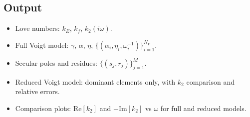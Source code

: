\documentclass[11pt]{article}
\begin{document}
\subsection*{Output}

\begin{itemize}[leftmargin=2em]
  \item Love numbers: $k_E$, $k_f$, $k_2(i\omega)$.
  \item Full Voigt model: $\gamma$, $\alpha$, $\eta$,
    $\{(\alpha_i, \eta_i, \omega_i^{-1})\}_{i=1}^{N_V}$.
  \item Secular poles and residues: $\{(s_j, r_j)\}_{j=1}^{M}$.
  \item Reduced Voigt model: dominant elements only, with
    $k_2$ comparison and relative errors.
  \item Comparison plots: $\mathrm{Re}[k_2]$ and
    $-\mathrm{Im}[k_2]$ vs $\omega$ for full and reduced models.
\end{itemize}
\end{document}
